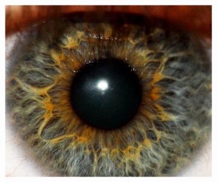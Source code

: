 \documentclass{article}
\begin{document}
\begin{figure}[H]
\begin{subfigure}{.09\textwidth}
  \label{fig:arrow}
\end{subfigure}%
\begin{subfigure}{.47\textwidth}
  \centering
  \includegraphics[width=0.97\linewidth]{_Figures/raw_data_3_gaussian.png}
  \caption{}
  \label{fig:raw_3_gaussian}
\end{subfigure}



\end{figure}
\end{document}

